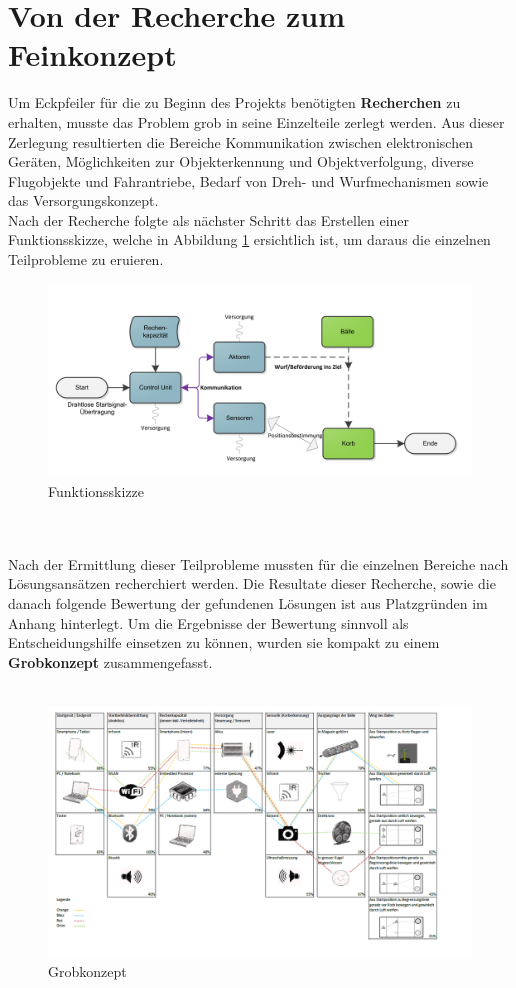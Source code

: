 \section{Von der Recherche zum Feinkonzept}
Um Eckpfeiler für die zu Beginn des Projekts benötigten \textbf{Recherchen} zu erhalten, musste das Problem grob in seine Einzelteile zerlegt werden. Aus dieser Zerlegung resultierten die Bereiche Kommunikation zwischen elektronischen Geräten, Möglichkeiten zur Objekterkennung und Objektverfolgung, diverse Flugobjekte und Fahrantriebe, Bedarf von Dreh- und Wurfmechanismen sowie das Versorgungskonzept. \\
Nach der Recherche folgte als nächster Schritt das Erstellen einer  Funktionsskizze, welche in Abbildung \ref{fig:Funktionsskizze} ersichtlich ist, um daraus die einzelnen Teilprobleme zu eruieren.\\
\begin{figure}[h!]
	\centering
	\includegraphics[width=1\textwidth]{Enddokumentation/Varianten/Bilder/Funktionsskizze.png}
	\caption{Funktionsskizze}
	\label{fig:Funktionsskizze}
\end{figure}
\\\\
Nach der Ermittlung dieser Teilprobleme mussten für die einzelnen Bereiche nach Lösungsansätzen recherchiert werden. Die Resultate dieser Recherche, sowie die danach folgende Bewertung der gefundenen Lösungen ist aus Platzgründen im Anhang hinterlegt. Um die Ergebnisse der Bewertung sinnvoll als Entscheidungshilfe einsetzen zu können, wurden sie kompakt zu einem \textbf{Grobkonzept} zusammengefasst.\\
\\
\begin{figure}[h!]
	\centering
	\includegraphics[width=1\textwidth]{Enddokumentation/Varianten/Bilder/Grobkonzept.png}
	\caption{Grobkonzept}
	\label{fig:Grobkonzept}
\end{figure}

